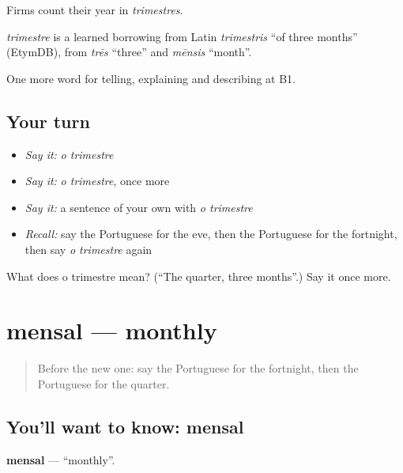 Firms count their year in \emph{trimestres}.

\begin{cousinweb}
\emph{trimestre} is a learned borrowing from Latin \emph{trimestris} \textquotedblleft{}of three months\textquotedblright{} (EtymDB), from \emph{trēs} \textquotedblleft{}three\textquotedblright{} and \emph{mēnsis} \textquotedblleft{}month\textquotedblright{}.
\end{cousinweb}

\begin{grammarlens}[title={What you've built}]
One more word for telling, explaining and describing at B1.
\end{grammarlens}

\subsection*{Your turn}
\begin{itemize}
\raggedright
  \item \emph{Say it:} \emph{o trimestre}
  \item \emph{Say it:} \emph{o trimestre}, once more
  \item \emph{Say it:} a sentence of your own with \emph{o trimestre}
  \item \emph{Recall:} say the Portuguese for the eve, then the Portuguese for the fortnight, then say \emph{o trimestre} again
\end{itemize}

\begin{tcolorbox}[breakable,colback=teal!4,colframe=teal!35!black,title={Before you move on}]
What does o trimestre mean? (\textquotedblleft{}The quarter, three months\textquotedblright{}.) Say it once more.
\end{tcolorbox}
\section[mensal]{mensal — monthly}

\label{lesson:PT-C276-mensal}



\begin{quote}
Before the new one: say the Portuguese for the fortnight, then the Portuguese for the quarter.
\end{quote}

\subsection*{You'll want to know: mensal}
\textbf{mensal} — \textquotedblleft{}monthly\textquotedblright{}.

